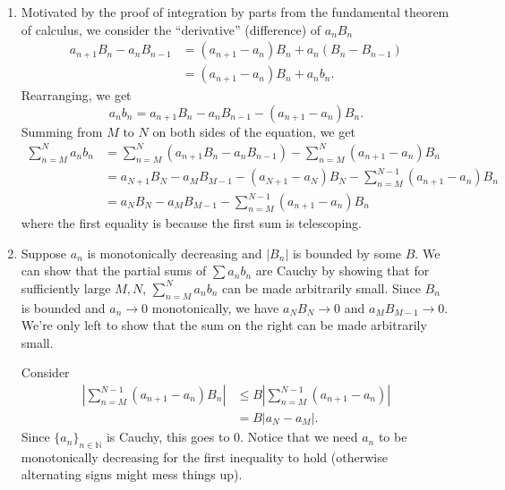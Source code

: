 \documentclass[12 pt, letterpaper]{hmcpset}
\begin{document}
\begin{solution}
	\begin{enumerate}
		\item Motivated by the proof of integration by parts from the fundamental theorem of calculus, we consider the ``derivative'' (difference) of $a_{n} B_{n}$
			\begin{align*}
				a_{n + 1} B_{n} - a_{n} B_{n - 1} & = (a_{n + 1} - a_{n}) B_{n} + a_{n}(B_{n} - B_{n - 1}) \\
								  & = (a_{n + 1} - a_{n}) B_{n} + a_{n} b_{n}.
			\end{align*}
			Rearranging, we get
			\[
				a_{n} b_{n} = a_{n + 1} B_{n} - a_{n} B_{n - 1} - (a_{n + 1} - a_{n}) B_{n}.
			\]
			Summing from $M$ to $N$ on both sides of the equation, we get
			\begin{align*}
				\sum_{n = M}^{N} a_{n} b_{n} & = \sum_{n = M}^{N} (a_{n + 1} B_{n} - a_{n} B_{n - 1}) - \sum_{n = M}^{N} (a_{n + 1} - a_{n}) B_{n} \\
							     & = a_{N + 1} B_{N} - a_{M} B_{M - 1} - (a_{N + 1} - a_{N}) B_{N} - \sum_{n = M}^{N - 1} (a_{n + 1} - a_{n}) B_{n} \\
							     & = a_{N} B_{N} - a_{M} B_{M - 1} - \sum_{n = M}^{N - 1} (a_{n + 1} - a_{n}) B_{n}
			\end{align*}
			where the first equality is because the first sum is telescoping.

		\item Suppose $a_{n}$ is monotonically decreasing and $\lvert B_{n} \rvert$ is bounded by some $B$. We can show that the partial sums of $\sum a_{n} b_{n}$ are Cauchy by showing that for sufficiently large $M, N$, $\sum_{n = M}^{N} a_{n} b_{n}$ can be made arbitrarily small. Since $B_{n}$ is bounded and $a_{n} \to 0$ monotonically, we have $a_{N} B_{N} \to 0$ and $a_{M} B_{M - 1} \to 0$. We're only left to show that the sum on the right can be made arbitrarily small.

			Consider
			\begin{align*}
				\left \lvert \sum_{n = M}^{N - 1} (a_{n + 1} - a_{n}) B_{n} \right \rvert & \le B \left \lvert \sum_{n = M}^{N - 1} (a_{n + 1} - a_{n}) \right \rvert \\
				& = B \lvert a_{N} - a_{M} \rvert.
			\end{align*}
			Since $\{ a_{n} \}_{n \in \mathbb{N}}$ is Cauchy, this goes to $0$. Notice that we need $a_{n}$ to be monotonically decreasing for the first inequality to hold (otherwise alternating signs might mess things up).
	\end{enumerate}
\end{solution}
\end{document}
